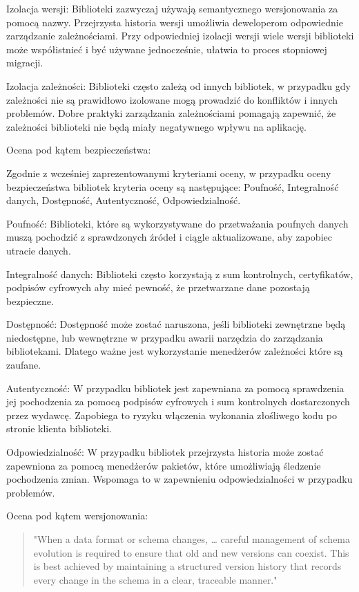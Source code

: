 \documentclass[runningheads,12pt]{llncs}
\begin{document}
Izolacja wersji: Biblioteki zazwyczaj używają semantycznego wersjonowania za pomocą nazwy. Przejrzysta historia wersji umożliwia deweloperom odpowiednie zarządzanie zależnościami. Przy odpowiedniej izolacji wersji wiele wersji biblioteki może współistnieć i być używane jednocześnie, ułatwia to proces stopniowej migracji. ~\cite[p. 172]{fowler2012patterns}

Izolacja zależności: Biblioteki często zależą od innych bibliotek, w przypadku gdy zależności nie są prawidłowo izolowane mogą prowadzić do konfliktów i innych problemów. Dobre praktyki zarządzania zależnościami pomagają zapewnić, że zależności biblioteki nie będą miały negatywnego wpływu na aplikację. ~\cite[p. 218]{martin2008clean}

Ocena pod kątem bezpieczeństwa:

Zgodnie z wcześniej zaprezentowanymi kryteriami oceny, w przypadku oceny bezpieczeństwa bibliotek kryteria oceny są następujące: Poufność, Integralność danych, Dostępność, Autentyczność, Odpowiedzialność.

Poufność: Biblioteki, które są wykorzystywane do przetważania poufnych danych muszą pochodzić z sprawdzonych źródeł i ciągle aktualizowane, aby zapobiec utracie danych. ~\cite[p. 82]{Essential}

Integralność danych: Biblioteki często korzystają z sum kontrolnych, certyfikatów, podpisów cyfrowych aby mieć pewność, że przetwarzane dane pozostają bezpieczne. ~\cite[p. 84]{Essential}

Dostępność: Dostępność może zostać naruszona, jeśli biblioteki zewnętrzne będą niedostępne, lub wewnętrzne w przypadku awarii narzędzia do zarządzania bibliotekami. Dlatego ważne jest wykorzystanie menedżerów zależności które są zaufane. ~\cite[p. 85]{Essential}

Autentyczność: W przypadku bibliotek jest zapewniana za pomocą sprawdzenia jej pochodzenia za pomocą podpisów cyfrowych i sum kontrolnych dostarczonych przez wydawcę. Zapobiega to ryzyku włączenia wykonania złośliwego kodu po stronie klienta biblioteki.  ~\cite[p. 87]{Essential}

Odpowiedzialność: W przypadku bibliotek przejrzysta historia może zostać zapewniona za pomocą menedżerów pakietów, które umożliwiają śledzenie pochodzenia zmian. Wspomaga to w zapewnieniu odpowiedzialności w przypadku problemów.  ~\cite[p. 88]{Essential}

Ocena pod kątem wersjonowania:

\begin{quote}
    "When a data format or schema changes, … careful management of schema evolution is required to ensure that old and new versions can coexist. This is best achieved by maintaining a structured version history that records every change in the schema in a clear, traceable manner." ~\cite[p. 111]{kleppmann2017designing}
\end{quote}
\end{document}
